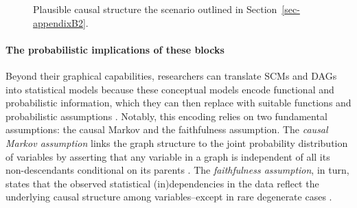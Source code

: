 \documentclass[
  authoryear,
  review,
  1p]{elsarticle}
\let\oldparagraph\paragraph
\renewcommand{\paragraph}[1]{\oldparagraph{#1}\mbox{}}
\begin{document}
\begin{figure}

\begin{minipage}{0.50\linewidth}

\centering{

\[
\begin{aligned}
  X & := f_{X}(e_{X}) \\
  T & := f_{T}(X,e_{T}) \\
  Y & := f_{Y}(T,X,e_{Y}) \\
  e_{T} & \:\bot\:e_{X} \\
  e_{T} & \:\bot\:e_{Y} \\
  e_{X} & \:\bot\:e_{Y}
\end{aligned}
\]

}


\end{minipage}%
%
\begin{minipage}{0.50\linewidth}



\end{minipage}%

\caption{\label{fig-example1}Plausible causal structure the scenario
outlined in Section~\ref{sec-appendixB2}.}

\end{figure}%

\paragraph{The probabilistic implications of these
blocks}\label{sec-appendixB32}

Beyond their graphical capabilities, researchers can translate SCMs and
DAGs into statistical models because these conceptual models encode
functional and probabilistic information, which they can then replace
with suitable functions and probabilistic assumptions
\citep{Pearl_et_al_2016}. Notably, this encoding relies on two
fundamental assumptions: the causal Markov and the faithfulness
assumption. The \emph{causal Markov assumption} links the graph
structure to the joint probability distribution of variables by
asserting that any variable in a graph is independent of all its
non-descendants conditional on its parents
\citetext{\citealp[p.~20]{Neal_2020}; \citealp[p.~80]{Hernan_et_al_2025}}.
The \emph{faithfulness assumption}, in turn, states that the observed
statistical (in)dependencies in the data reflect the underlying causal
structure among variables--except in rare degenerate cases
\citetext{\citealp[p.~100]{Neal_2020}; \citealp[p.~81]{Hernan_et_al_2025}}.
\end{document}
